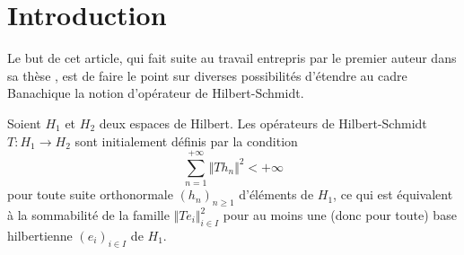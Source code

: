 \documentclass{smfart}
\theoremstyle{plain}
\theoremstyle{definition}
\begin{document}
\maketitle




\section{Introduction} 


Le but de cet article, qui fait suite au travail entrepris par le
premier auteur dans sa thèse \cite{Abd}, est de faire le point sur
diverses possibilités d'étendre au cadre Banachique la notion
d'opérateur de Hilbert-Schmidt.


Soient $H_1$ et $H_2$ deux espaces de Hilbert. Les opérateurs de
Hilbert-Schmidt $T:H_1 \to H_2$ sont initialement définis par la
condition
\[
   \sum \limits_{n=1} ^{+\infty}\Vert Th_n\Vert^2<+\infty
\]
pour toute suite orthonormale $(h_n)_{n\ge 1}$ d'éléments de $H_1$,
ce qui est équivalent à la sommabilité de la famille $\Vert
Te_i\Vert^2_{i\in I}$ pour au moins une (donc pour toute) base
hilbertienne $(e_i)_{i \in I}$ de $H_1$.
\end{document}
